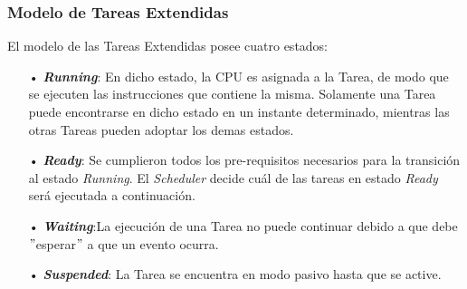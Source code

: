 \documentclass[12pt,letterpaper]{article}
\begin{document}
\begin{table}[h]
\begin{center}
\caption{Tabla de transiciones de las Tareas del tipo \textit{Basic}.}
\label{Tab3}
\end{center}
\end{table}

\subsubsection{Modelo de Tareas Extendidas}
El modelo de las Tareas Extendidas posee cuatro estados:
\begin{enumerate}
\item[•]\emph{\textbf{Running}}: En dicho estado, la CPU es asignada a la Tarea, de modo que se ejecuten las instrucciones que contiene la misma. Solamente una Tarea puede encontrarse en dicho estado en un instante determinado, mientras las otras Tareas pueden adoptar los demas estados.
\item[•]\emph{\textbf{Ready}}: Se cumplieron todos los pre-requisitos necesarios para la transición al estado \textit{Running}. El \textit{Scheduler} decide cuál de las tareas en estado \textit{Ready} será ejecutada a continuación.
\item[•]\emph{\textbf{Waiting}}:La ejecución de una Tarea no puede continuar debido a que debe $"$esperar$"$ a que un evento ocurra.
\item[•]\emph{\textbf{Suspended}}: La Tarea se encuentra en modo pasivo hasta que se active.
\end{enumerate}
\end{document}
